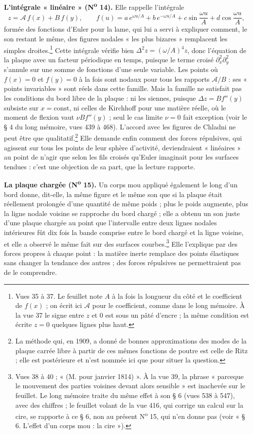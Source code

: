 \documentclass[11pt,a4paper]{article}
\begin{document}
\textbf{L'intégrale « linéaire » (N\textsuperscript{o} 14).} Elle rappelle
l'intégrale
\[
z = \mathcal{A}\,f(x) + B\,f(y), \qquad f(u) = a\,e^{\omega u/A} + b\,e^{-\omega
u/A} + c\sin\frac{\omega u}{A} + d\cos\frac{\omega u}{A},
\]
formée des fonctions d'Euler pour la lame, qui lui a servi à expliquer comment,
le son restant le même, des figures nodales « les plus bizares » remplacent les simples
droites.\footnote{Vues 35 à 37. Le feuillet note $A$ à la fois la longueur du
côté et le coefficient de $f(x)$ ; on écrit ici $\mathcal{A}$ pour le
coefficient, comme dans le long mémoire. À la vue 37 le signe entre $z$ et $0$
est sous un pâté d'encre ; la même condition est écrite $z = 0$ quelques
lignes plus haut.} Cette intégrale vérifie bien $\Delta^2 z = (\omega/A)^4 z$,
donc l'équation de la plaque avec un facteur périodique en temps, puisque le
terme croisé $\partial_x^2\partial_y^2$ s'annule sur une somme de fonctions
d'une seule variable. Les points où $f(x) = 0$ et $f(y) = 0$ à la fois sont
nodaux pour tous les rapports $\mathcal{A}/B$ : ses « points invariables » sont
réels dans cette famille. Mais la famille ne satisfait pas les conditions du
bord libre de la plaque : ni les siennes, puisque $\Delta z = B f''(y)$ subsiste
sur $x = \mathrm{const}$, ni celles de Kirchhoff pour une matière réelle, où le
moment de flexion vaut $\nu B f''(y)$ ; seul le cas limite $\nu = 0$ fait
exception (voir le § 4 du long mémoire, vues 439 à 468). L'accord avec les figures
de Chladni ne peut être que qualitatif.\footnote{La méthode qui, en 1909, a donné
de bonnes approximations des modes de la plaque carrée libre à partir de ces
mêmes fonctions de poutre est celle de Ritz ; elle est postérieure et n'est
nommée ici que pour situer la question.} Elle demande enfin comment des forces
répulsives, qui agissent sur tous les points de leur sphère d'activité,
deviendraient « linéaires » au point de n'agir que selon les fils croisés
qu'Euler imaginait pour les surfaces tendues : c'est une objection de sa part,
que la lecture rapporte.

\textbf{La plaque chargée (N\textsuperscript{o} 15).} Un corps mou appliqué
également le long d'un bord donne, dit-elle, la même figure et le même son que
si la plaque était réellement prolongée d'une quantité de même poids ; plus le
poids augmente, plus la ligne nodale voisine se rapproche du bord chargé ; elle
a obtenu un son juste d'une plaque chargée au point que l'intervalle entre deux
lignes nodales intérieures fût dix fois la bande comprise entre le bord chargé
et la ligne voisine, et elle a observé le même fait sur des surfaces
courbes.\footnote{Vues 38 à 40 ; « (M. pour janvier 1814) ». À la vue 39, la
phrase « parceque le mouvement des parties voisines devant alors sensible » est
inachevée sur le feuillet. Le long mémoire traite du même effet à son § 6
(vues 538 à 547), avec des chiffres ; le feuillet volant de la vue 416, qui
corrige un calcul sur la cire, se rapporte à ce § 6, non au présent
N\textsuperscript{o} 15, qui n'en donne pas (voir « § 6. L'effet d'un corps mou :
la cire »).} Elle l'explique par des forces propres à chaque point : la matière inerte
remplace des points élastiques sans changer la tendance des autres ; des forces
répulsives ne permettraient pas de le comprendre.
\end{document}
